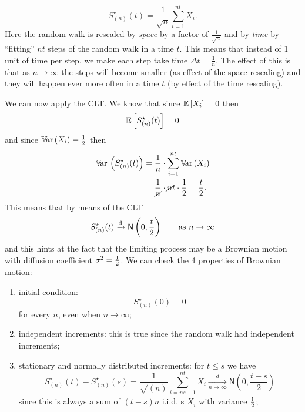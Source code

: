 \documentclass[12pt]{article}
\begin{document}
\begin{enumerate}
		\begin{equation*}
			S^{\star}_{(n)}(t)=\frac{1}{\sqrt{n}}\sum_{i=1}^{nt}X_{i}.
		\end{equation*}
		Here the random walk is rescaled by \textit{space} by a factor of $\frac{1}{\sqrt{n}}$ and by \textit{time} by ``fitting'' $nt$ steps of the random walk in a time $t$. This means that instead of 1 unit of time per step, we make each step take time $\Delta t=\frac{1}{n}$. The effect of this is that as $n\to\infty$ the steps will become smaller (as effect of the space rescaling) and they will happen ever more often in a time $t$ (by effect of the time rescaling). \par
		We can now apply the CLT. We know that since $\mathbb{E}\left[X_{i}\right]=0$ then
		\begin{equation*}
			\mathbb{E}\left[S^{\star}_{(n)}(t)\right]=0
		\end{equation*}
		and since $\mathbb{V}\!\mathrm{ar}\,(X_{i})=\frac{1}{2}$ then
		\begin{align*}
			\mathbb{V}\!\mathrm{ar}\,\left(S^{\star}_{(n)}(t)\right)&=\frac{1}{n}\cdot\sum_{i=1}^{nt}\mathbb{V}\!\mathrm{ar}\,(X_{i})\\
			&=\frac{1}{\cancel{n}}\cdot \cancel{n}t\cdot\frac{1}{2}=\frac{t}{2}.
		\end{align*}
		This means that by means of the CLT
		\begin{equation*}
			S^{\star}_{(n)}(t)\xrightarrow[]{\text{d}}\mathsf{N}\left(0,\frac{t}{2}\right)\qquad\text{as }n\to\infty
		\end{equation*}
		and this hints at the fact that the limiting process may be a Brownian motion with diffusion coefficient $\sigma^{2}=\frac{1}{2}$. We can check the 4 properties of Brownian motion:
		\begin{enumerate}[\circnum]
			\item initial condition:
			\begin{equation*}
				S^{\star}_{(n)}(0)=0
			\end{equation*}
			for every $n$, even when $n\to\infty$;
			\item independent increments: this is true since the random walk had independent increments;
			\item stationary and normally distributed increments: for $t\leq s$ we have
			\begin{equation*}
				S^{\star}_{(n)}(t)-S^{\star}_{(n)}(s)=\frac{1}{\sqrt{(n)}}\sum_{i=ns+1}^{nt}X_{i}\xrightarrow[n\to\infty]{d}\mathsf{N}\left(0,\frac{t-s}{2}\right)
			\end{equation*}
			since this is always a sum of $(t-s)n$ i.i.d. \rv s $X_{i}$ with variance $\frac{1}{2}$;

\end{enumerate}
\end{enumerate}
\end{document}
